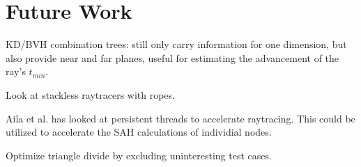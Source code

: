

\chapter{Future Work}\label{chp:future}


KD/BVH combination trees: still only carry information for one
dimension, but also provide near and far planes, useful for estimating
the advancement of the ray's $t_{min}$.

Look at stackless raytracers with ropes.

Aila et al. has looked at persistent threads to
accelerate raytracing. This could be utilized to accelerate the SAH
calculations of individial nodes.

Optimize triangle divide by excluding uninteresting test cases.
